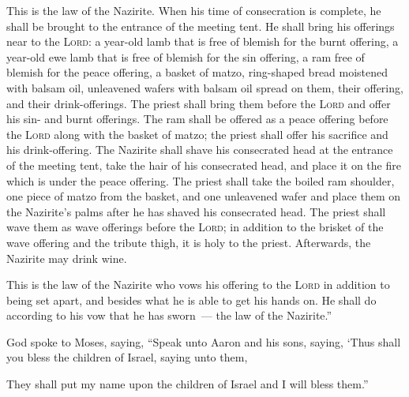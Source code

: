 \begin{inparaenum}
   This is the law of the Nazirite. When his time of consecration is complete, he shall be brought to the entrance of the meeting tent.%
   He shall bring his offerings near to the \textsc{Lord}: a year-old lamb that is free of blemish for the burnt offering, a year-old ewe lamb that is free of blemish for the sin offering, a ram free of blemish for the peace offering,%
   a basket of matzo, ring-shaped bread moistened with balsam oil, unleavened wafers with balsam oil spread on them, their offering, and their drink-offerings.%
   The priest shall bring them before the \textsc{Lord} and offer his sin- and burnt offerings.%
   The ram shall be offered as a peace offering before the \textsc{Lord} along with the basket of matzo; the priest shall offer his sacrifice and his drink-offering.%
   The Nazirite shall shave his consecrated head at the entrance of the meeting tent, take the hair of his consecrated head, and place it on the fire which is under the peace offering.%
   The priest shall take the boiled ram shoulder, one piece of matzo from the basket, and one unleavened wafer and place them on the Nazirite's palms after he has shaved his consecrated head.%
   The priest shall wave them as wave offerings before the \textsc{Lord}; in addition to the brisket of the wave offering and the tribute thigh, it is holy to the priest. Afterwards, the Nazirite may drink wine.%
  
   This is the law of the Nazirite who vows his offering to the \textsc{Lord} in addition to being set apart, and besides what he is able to get his hands on. He shall do according to his vow that he has sworn~--- the law of the Nazirite.''%
  
   God spoke to Moses, saying,%
   ``Speak unto Aaron and his sons, saying, `Thus shall you bless the children of Israel, saying unto them,%
  
  
  
  
   They shall put my name upon the children of Israel and I will bless them.''%
\end{inparaenum}

